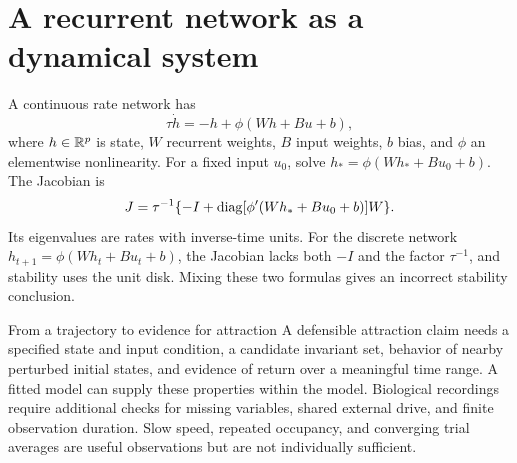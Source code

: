 \section{A recurrent network as a dynamical system}
A continuous rate network has
\begin{equation}\label{eq:rate-network-foundation}
\tau\dot h=-h+\phi(Wh+Bu+b),
\end{equation}
where $h\in\mathbb{R}^p$ is state, $W$ recurrent weights, $B$ input weights, $b$ bias, and $\phi$ an elementwise nonlinearity. For a fixed input $u_0$, solve $h_* =\phi(Wh_*+Bu_0+b)$. The Jacobian is
\begin{equation}
J=\tau^{-1}\{-I+\operatorname{diag}[\phi'(Wh_*+Bu_0+b)]W\}.
\end{equation}
Its eigenvalues are rates with inverse-time units. For the discrete network $h_{t+1}=\phi(Wh_t+Bu_t+b)$, the Jacobian lacks both $-I$ and the factor $\tau^{-1}$, and stability uses the unit disk. Mixing these two formulas gives an incorrect stability conclusion.

\begin{insight}{From a trajectory to evidence for attraction}
A defensible attraction claim needs a specified state and input condition, a candidate invariant set, behavior of nearby perturbed initial states, and evidence of return over a meaningful time range. A fitted model can supply these properties within the model. Biological recordings require additional checks for missing variables, shared external drive, and finite observation duration. Slow speed, repeated occupancy, and converging trial averages are useful observations but are not individually sufficient.
\end{insight}

